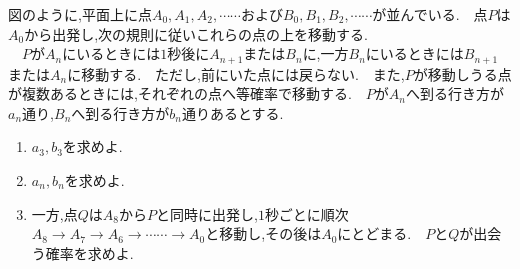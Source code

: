 \begin{problem}
図のように,平面上に点$A_0,A_1,A_2,\cdots\cdots$および$B_0,B_1,B_2,\cdots\cdots$が並んでいる.　点$P$は$A_0$から出発し,次の規則に従いこれらの点の上を移動する.\\
　$PがA_n$にいるときには$1$秒後に$A_{n+1}$または$B_n$に,一方$B_n$にいるときには$B_{n+1}$または$A_n$に移動する.　ただし,前にいた点には戻らない.　また,$P$が移動しうる点が複数あるときには,それぞれの点へ等確率で移動する.　$P$が$A_n$へ到る行き方が$a_n$通り,$B_n$へ到る行き方が$b_n$通りあるとする.
  \begin{enumerate}
    \item $a_3,b_3$を求めよ.
    \item $a_n,b_n$を求めよ.
    \item 一方,点$Q$は$A_8$から$P$と同時に出発し,$1$秒ごとに順次$A_8\rightarrow A_7 \rightarrow A_6\rightarrow \cdots\cdots\rightarrow A_0$と移動し,その後は$A_0$にとどまる.　$P$と$Q$が出会う確率を求めよ.
 \end{enumerate}
\end{problem}
\kaie
